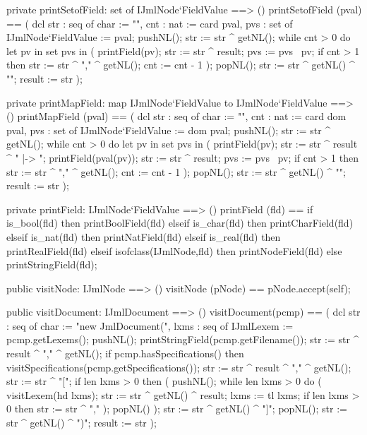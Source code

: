 \begin{vdm_al}
  private printSetofField: set of IJmlNode`FieldValue ==> ()
  printSetofField (pval) ==
    ( dcl str : seq of char := "{", cnt : nat := card pval,
          pvs : set of IJmlNode`FieldValue := pval;
      pushNL();
      str := str ^ getNL();
      while cnt > 0 do
        let pv in set pvs in
          ( printField(pv);
            str := str ^ result;
            pvs := pvs \ {pv};
            if cnt > 1
            then str := str ^ "," ^ getNL();
            cnt := cnt - 1 ); 
      popNL();
      str := str ^ getNL() ^ "}";
      result := str );

  private printMapField: map IJmlNode`FieldValue to IJmlNode`FieldValue ==> ()
  printMapField (pval) == 
    ( dcl str : seq of char := "{", cnt : nat := card dom pval,
          pvs : set of IJmlNode`FieldValue := dom pval;
      pushNL();
      str := str ^ getNL();
      while cnt > 0 do
        let pv in set pvs in
          ( printField(pv);
            str := str ^ result ^ " |-> ";
            printField(pval(pv));
            str := str ^ result;
            pvs := pvs \ {pv};
            if cnt > 1
            then str := str ^ "," ^ getNL();
            cnt := cnt - 1 ); 
      popNL();
      str := str ^ getNL() ^ "}";
      result := str );

  private printField: IJmlNode`FieldValue ==> ()
  printField (fld) ==
    if is_bool(fld) then printBoolField(fld)
    elseif is_char(fld) then printCharField(fld)
    elseif is_nat(fld) then printNatField(fld)
    elseif is_real(fld) then printRealField(fld)
    elseif isofclass(IJmlNode,fld) then printNodeField(fld)
    else printStringField(fld);

  public visitNode: IJmlNode ==> ()
  visitNode (pNode) == pNode.accept(self);

  public visitDocument: IJmlDocument ==> ()
  visitDocument(pcmp) ==
    ( dcl str : seq of char := "new JmlDocument(",
          lxms : seq of IJmlLexem := pcmp.getLexems();
      pushNL();
      printStringField(pcmp.getFilename());
      str := str ^ result ^ "," ^ getNL();
      if pcmp.hasSpecifications() then visitSpecifications(pcmp.getSpecifications());
      str := str ^ result ^ "," ^ getNL();
      str := str ^ "[";
      if len lxms > 0
      then ( pushNL();
             while len lxms > 0 do
               ( visitLexem(hd lxms);
                 str := str ^ getNL() ^ result;
                 lxms := tl lxms;
                 if len lxms > 0
                 then str := str ^ "," );
             popNL() );
      str := str ^ getNL() ^ "]";
      popNL();
      str := str ^ getNL() ^ ")";
      result := str );


\end{vdm_al}
